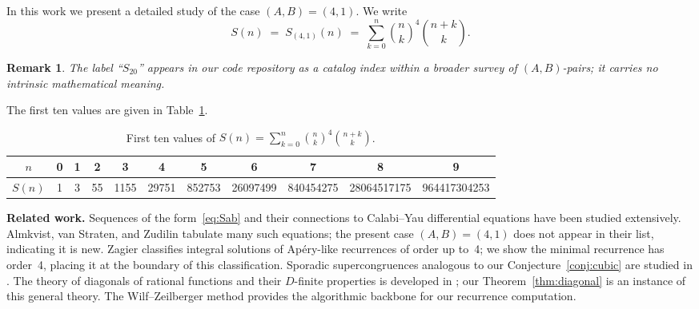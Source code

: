 \documentclass[11pt, a4paper]{article}
\newtheorem{remark}[theorem]{Remark}
\begin{document}
In this work we present a detailed study of the case $(A,B)=(4,1)$.  We write
\begin{equation}\label{eq:S20def}
  S(n) \;=\; S_{(4,1)}(n)
        \;=\; \sum_{k=0}^n \binom{n}{k}^4 \binom{n+k}{k}.
\end{equation}

\begin{remark}
The label ``$S_{20}$'' appears in our code repository as a catalog index
within a broader survey of $(A,B)$-pairs; it carries no intrinsic mathematical
meaning.
\end{remark}

The first ten values are given in Table~\ref{tab:s20}.
\begin{table}[ht]
    \centering
    \begin{tabular}{@{}ccccccccccc@{}}
        \toprule
        $n$ & 0 & 1 & 2 & 3 & 4 & 5 & 6 & 7 & 8 & 9 \\
        \midrule
        $S(n)$ & 1 & 3 & 55 & 1155 & 29751 & 852753 & 26097499 &
                  840454275 & 28064517175 & 964417304253 \\
        \bottomrule
    \end{tabular}
    \caption{First ten values of $S(n)=\sum_{k=0}^n\binom{n}{k}^4\binom{n+k}{k}$.}
    \label{tab:s20}
\end{table}

\medskip\noindent
\textbf{Related work.}
Sequences of the form~\eqref{eq:Sab} and their connections to Calabi--Yau
differential equations have been studied extensively.  Almkvist, van Straten,
and Zudilin \cite{Almkvist2005} tabulate many such equations; the present case
$(A,B)=(4,1)$ does not appear in their list, indicating it is new.  Zagier
\cite{Zagier2009} classifies integral solutions of Ap\'ery-like recurrences of
order up to~4; we show the minimal recurrence has order~4, placing it at the boundary of this classification.
Sporadic supercongruences analogous to our Conjecture~\ref{conj:cubic} are
studied in \cite{Osburn2016,Straub2014}.  The theory of diagonals of rational
functions and their $D$-finite properties is developed in
\cite{LipshitzPoorten1990}; our Theorem~\ref{thm:diagonal} is an instance of
this general theory.  The Wilf--Zeilberger method \cite{PetkovsekWilfZeilberger1996}
provides the algorithmic backbone for our recurrence computation.
\end{document}
